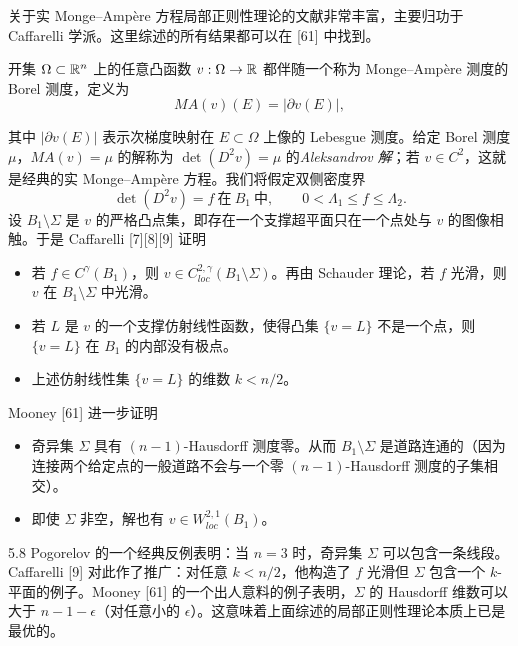 关于实 Monge--Ampère 方程局部正则性理论的文献非常丰富，主要归功于 Caffarelli 学派。这里综述的所有结果都可以在 [61] 中找到。

开集 $\Omega\subset\mathbb{R}^n$ 上的任意凸函数 $v:\Omega\to\mathbb{R}$ 都伴随一个称为 Monge--Ampère 测度的 Borel 测度，定义为
\[
MA(v)(E)=|\partial v(E)|,
\]

其中 $|\partial v(E)|$ 表示次梯度映射在 $E\subset\Omega$ 上像的 Lebesgue 测度。给定 Borel 测度 $\mu$，$MA(v)=\mu$ 的解称为 $\det(D^2v)=\mu$ 的\emph{Aleksandrov 解}；若 $v\in C^2$，这就是经典的实 Monge--Ampère 方程。我们将假定双侧密度界
\[
\det(D^2v)=f\ \text{在}\ B_1\ \text{中},\qquad 0<\Lambda_1\le f\le\Lambda_2.
\]
设 $B_1\setminus\Sigma$ 是 $v$ 的严格凸点集，即存在一个支撑超平面只在一个点处与 $v$ 的图像相触。于是 Caffarelli [7][8][9] 证明
\begin{itemize}
\item 若 $f\in C^\gamma(B_1)$，则 $v\in C^{2,\gamma}_{loc}(B_1\setminus\Sigma)$。再由 Schauder 理论，若 $f$ 光滑，则 $v$ 在 $B_1\setminus\Sigma$ 中光滑。
\item 若 $L$ 是 $v$ 的一个支撑仿射线性函数，使得凸集 $\{v=L\}$ 不是一个点，则 $\{v=L\}$ 在 $B_1$ 的内部没有极点。
\item 上述仿射线性集 $\{v=L\}$ 的维数 $k<n/2$。
\end{itemize}
Mooney [61] 进一步证明
\begin{itemize}
\item 奇异集 $\Sigma$ 具有 $(n-1)$-Hausdorff 测度零。从而 $B_1\setminus\Sigma$ 是道路连通的（因为连接两个给定点的一般道路不会与一个零 $(n-1)$-Hausdorff 测度的子集相交）。
\item 即使 $\Sigma$ 非空，解也有 $v\in W^{2,1}_{loc}(B_1)$。
\end{itemize}

\begin{remark}{5.8}
Pogorelov 的一个经典反例表明：当 $n=3$ 时，奇异集 $\Sigma$ 可以包含一条线段。Caffarelli [9] 对此作了推广：对任意 $k<n/2$，他构造了 $f$ 光滑但 $\Sigma$ 包含一个 $k$-平面的例子。Mooney [61] 的一个出人意料的例子表明，$\Sigma$ 的 Hausdorff 维数可以大于 $n-1-\epsilon$（对任意小的 $\epsilon$）。这意味着上面综述的局部正则性理论本质上已是最优的。
\end{remark}


